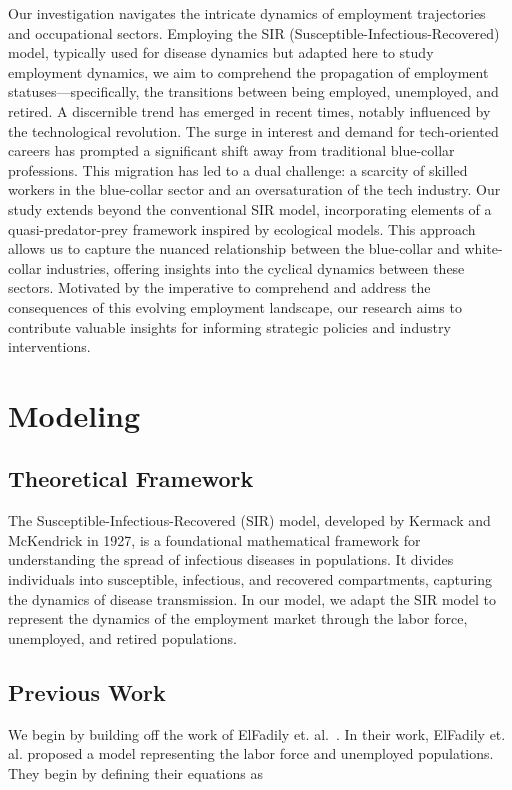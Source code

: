 \documentclass[11pt]{amsart}
\begin{document}
Our investigation navigates the intricate dynamics of employment trajectories and occupational sectors. 
Employing the SIR (Susceptible-Infectious-Recovered) model, typically used for disease dynamics but adapted 
here to study employment dynamics, we aim to comprehend the propagation of employment statuses—specifically, 
the transitions between being employed, unemployed, and retired. A discernible trend has emerged in recent times, 
notably influenced by the technological revolution. The surge in interest and demand for tech-oriented careers 
has prompted a significant shift away from traditional blue-collar professions. This migration has led to a 
dual challenge: a scarcity of skilled workers in the blue-collar sector and an oversaturation of the tech 
industry. Our study extends beyond the conventional SIR model, incorporating elements of a quasi-predator-prey 
framework inspired by ecological models. This approach allows us to capture the nuanced relationship between 
the blue-collar and white-collar industries, offering insights into the cyclical dynamics between these sectors. 
Motivated by the imperative to comprehend and address the consequences of this evolving employment landscape, 
our research aims to contribute valuable insights for informing strategic policies and industry interventions.

\section{Modeling}

\subsection{Theoretical Framework}

The Susceptible-Infectious-Recovered (SIR) model, developed by Kermack and McKendrick in 1927, 
is a foundational mathematical framework for understanding the spread of infectious diseases in populations. 
It divides individuals into susceptible, infectious, and recovered compartments, capturing the dynamics of disease transmission.
In our model, we adapt the SIR model to represent the dynamics of the employment market through the labor force,
unemployed, and retired populations.

\subsection{Previous Work}

We begin by building off the work of ElFadily et. al.~\cite{ElFadily}. In their work, ElFadily et. al. proposed a model
 representing the labor force and unemployed populations. They begin by defining their equations as
\end{document}
